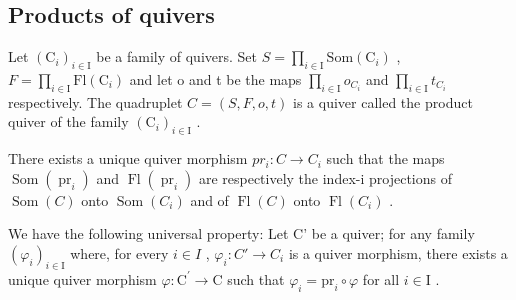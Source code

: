 \subsection{Products of quivers}

Let \((\mathrm{C}_{i})_{i\in\mathrm{I}}\) be a family of quivers. Set \(S = \prod_{i\in\mathrm{I}} \mathrm{Som}(\mathrm{C}_{i})\) , \(F = \prod_{i\in\mathrm{I}} \mathrm{Fl}(\mathrm{C}_{i})\) and let o and t be the maps \(\prod_{i\in\mathrm{I}} o_{C_{i}}\) and \(\prod_{i\in\mathrm{I}} t_{C_{i}}\) respectively. The quadruplet \(C = (S, F, o, t)\) is a quiver called the product quiver of the family \((\mathrm{C}_{i})_{i\in\mathrm{I}}\) .

There exists a unique quiver morphism \(pr_{i}: C \to C_{i}\) such that the maps \(\operatorname{Som}(\operatorname{pr}_{i})\) and \(\operatorname{Fl}(\operatorname{pr}_{i})\) are respectively the index-i projections of \(\operatorname{Som}(C)\) onto \(\operatorname{Som}(C_{i})\) and of \(\operatorname{Fl}(C)\) onto \(\operatorname{Fl}(C_{i})\) .

We have the following universal property: Let C' be a quiver; for any family \((\varphi_{i})_{i\in\mathrm{I}}\) where, for every \(i\in I\) , \(\varphi_{i}\colon C'\to C_{i}\) is a quiver morphism, there exists a unique quiver morphism \(\varphi\colon\mathrm{C}^{\prime}\to\mathrm{C}\) such that \(\varphi_{i}=\mathrm{pr}_{i}\circ\varphi\) for all \(i\in\mathrm{I}\) .

